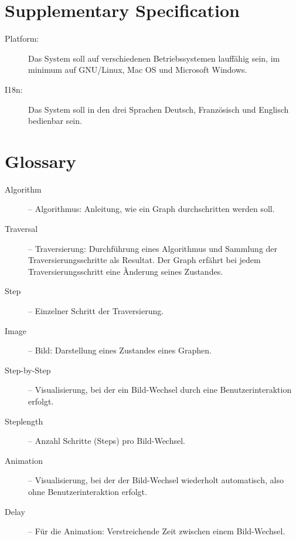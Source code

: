 \section{Supplementary Specification}
\label{sec:Supplementary Specification}
\begin{description}
  \item[Platform:] Das System soll auf verschiedenen Betriebssystemen lauff\"ahig sein, im minimum auf GNU/Linux, Mac OS und Microsoft Windows.
  \item[I18n:] Das System soll in den drei Sprachen Deutsch, Franz\"osisch und Englisch bedienbar sein.
\end{description}
% 
\section{Glossary}
\label{sec:Glossary}
\begin{description}
  \item[Algorithm] -- Algorithmus: Anleitung, wie ein Graph durchschritten werden soll.
  \item[Traversal] -- Traversierung: Durchf\"uhrung eines Algorithmus und Sammlung der Traversierungsschritte als Resultat. Der Graph erf\"ahrt bei jedem Traversierungsschritt eine \`Anderung seines Zustandes.
  \item[Step] -- Einzelner Schritt der Traversierung.
  \item[Image] -- Bild: Darstellung eines Zustandes eines Graphen.
  \item[Step-by-Step] -- Visualisierung, bei der ein Bild-Wechsel durch eine Benutzerinteraktion erfolgt.
  \item[Steplength] -- Anzahl Schritte (Steps) pro Bild-Wechsel.
  \item[Animation] -- Visualisierung, bei der der Bild-Wechsel wiederholt automatisch, also ohne Benutzerinteraktion erfolgt.
  \item[Delay] -- F\"ur die Animation: Verstreichende Zeit zwischen einem Bild-Wechsel.
\end{description}
% 
